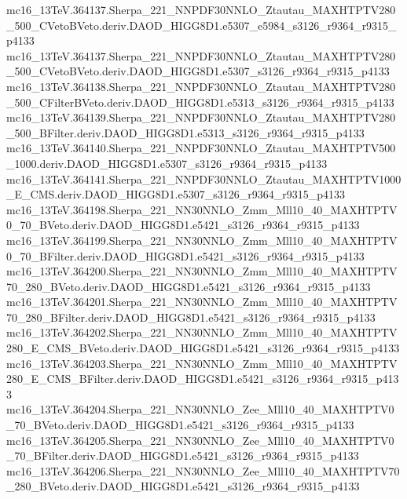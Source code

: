 \begin{footnotesize}
mc16\_13TeV.364137.Sherpa\_221\_NNPDF30NNLO\_Ztautau\_MAXHTPTV280\_500\_CVetoBVeto.deriv.DAOD\_HIGG8D1.e5307\_e5984\_s3126\_r9364\_r9315\_p4133 \\
mc16\_13TeV.364137.Sherpa\_221\_NNPDF30NNLO\_Ztautau\_MAXHTPTV280\_500\_CVetoBVeto.deriv.DAOD\_HIGG8D1.e5307\_s3126\_r9364\_r9315\_p4133 \\
mc16\_13TeV.364138.Sherpa\_221\_NNPDF30NNLO\_Ztautau\_MAXHTPTV280\_500\_CFilterBVeto.deriv.DAOD\_HIGG8D1.e5313\_s3126\_r9364\_r9315\_p4133 \\
mc16\_13TeV.364139.Sherpa\_221\_NNPDF30NNLO\_Ztautau\_MAXHTPTV280\_500\_BFilter.deriv.DAOD\_HIGG8D1.e5313\_s3126\_r9364\_r9315\_p4133 \\
mc16\_13TeV.364140.Sherpa\_221\_NNPDF30NNLO\_Ztautau\_MAXHTPTV500\_1000.deriv.DAOD\_HIGG8D1.e5307\_s3126\_r9364\_r9315\_p4133 \\
mc16\_13TeV.364141.Sherpa\_221\_NNPDF30NNLO\_Ztautau\_MAXHTPTV1000\_E\_CMS.deriv.DAOD\_HIGG8D1.e5307\_s3126\_r9364\_r9315\_p4133 \\
mc16\_13TeV.364198.Sherpa\_221\_NN30NNLO\_Zmm\_Mll10\_40\_MAXHTPTV0\_70\_BVeto.deriv.DAOD\_HIGG8D1.e5421\_s3126\_r9364\_r9315\_p4133 \\
mc16\_13TeV.364199.Sherpa\_221\_NN30NNLO\_Zmm\_Mll10\_40\_MAXHTPTV0\_70\_BFilter.deriv.DAOD\_HIGG8D1.e5421\_s3126\_r9364\_r9315\_p4133 \\
mc16\_13TeV.364200.Sherpa\_221\_NN30NNLO\_Zmm\_Mll10\_40\_MAXHTPTV70\_280\_BVeto.deriv.DAOD\_HIGG8D1.e5421\_s3126\_r9364\_r9315\_p4133 \\
mc16\_13TeV.364201.Sherpa\_221\_NN30NNLO\_Zmm\_Mll10\_40\_MAXHTPTV70\_280\_BFilter.deriv.DAOD\_HIGG8D1.e5421\_s3126\_r9364\_r9315\_p4133 \\
mc16\_13TeV.364202.Sherpa\_221\_NN30NNLO\_Zmm\_Mll10\_40\_MAXHTPTV280\_E\_CMS\_BVeto.deriv.DAOD\_HIGG8D1.e5421\_s3126\_r9364\_r9315\_p4133 \\
mc16\_13TeV.364203.Sherpa\_221\_NN30NNLO\_Zmm\_Mll10\_40\_MAXHTPTV280\_E\_CMS\_BFilter.deriv.DAOD\_HIGG8D1.e5421\_s3126\_r9364\_r9315\_p4133 \\
mc16\_13TeV.364204.Sherpa\_221\_NN30NNLO\_Zee\_Mll10\_40\_MAXHTPTV0\_70\_BVeto.deriv.DAOD\_HIGG8D1.e5421\_s3126\_r9364\_r9315\_p4133 \\
mc16\_13TeV.364205.Sherpa\_221\_NN30NNLO\_Zee\_Mll10\_40\_MAXHTPTV0\_70\_BFilter.deriv.DAOD\_HIGG8D1.e5421\_s3126\_r9364\_r9315\_p4133 \\
mc16\_13TeV.364206.Sherpa\_221\_NN30NNLO\_Zee\_Mll10\_40\_MAXHTPTV70\_280\_BVeto.deriv.DAOD\_HIGG8D1.e5421\_s3126\_r9364\_r9315\_p4133 \\

\end{footnotesize}
